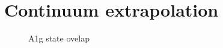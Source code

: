 \section{Continuum extrapolation}\label{sec:continuum}

\begin{figure}[ht!]
\center

\caption{A1g state ovelap\label{fig:a1g-state-overlap}}
\end{figure}

